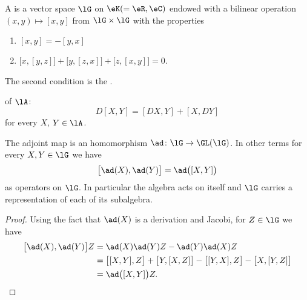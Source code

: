 
\begin{definition}      \label{DEFooVBPKooGxlDBn}
    A  is a vector space \( \lG\) on \( \eK(=\eR,\eC)\) endowed with a bilinear operation \( (x,y)\mapsto [x,y]\) from \( \lG\times\lG\) with the properties
    \begin{enumerate}
        \item
            \( [x,y]=-[y,x]\)
        \item
            \( \big[ x,[y,z] \big]+\big[ y,[z,x] \big]+\big[ z,[x,y] \big]=0\).
    \end{enumerate}
    The second condition is the .
\end{definition}

\begin{definition}      \label{DEFooDUEUooZLhKdv}
     of $\lA$:
    \begin{equation}
      D[X,Y]=[DX,Y]+[X,DY]
    \end{equation}
    for every $X$, $Y\in\lA$. 
\end{definition}

\begin{lemma}       \label{LemadhomomadXadYadXY}
    The adjoint map is an homomorphism \( \ad\colon \lG\to \GL(\lG)\). In other terms for every \( X,Y\in\lG\) we have
    \begin{equation}
        \big[ \ad(X),\ad(Y) \big]=\ad\big( [X,Y] \big)
    \end{equation}
    as operators on \( \lG\). In particular the algebra acts on itself and \( \lG\) carries a representation of each of its subalgebra.
\end{lemma}

\begin{proof}
    Using the fact that \( \ad(X)\) is a derivation and Jacobi, for \( Z\in\lG\) we have
    \begin{subequations}
        \begin{align}
            \big[ \ad(X),\ad(Y) \big]Z&=\ad(X)\ad(Y)Z-\ad(Y)\ad(X)Z\\
            &=\big[ [X,Y],Z \big]+\big[ Y,[X,Z] \big]-\big[ [Y,X],Z \big]-\big[ X,[Y,Z] \big]\\
            &=\ad\big( [X,Y] \big)Z.
        \end{align}
    \end{subequations}
\end{proof}

